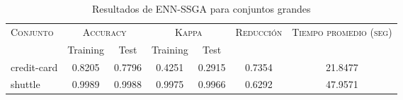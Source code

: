 \begin{table}[]
\centering
\begin{tabular}{l c c c c c c}
\hline
\multirow{2}{*}{\textsc{Conjunto}}
	& \multicolumn{2}{c}{\textsc{Accuracy}}
	& \multicolumn{2}{c}{\textsc{Kappa}}
	& \textsc{Reducción}
	& \textsc{Tiempo promedio (seg)} \\
	& Training & Test
	& Training & Test \\ 
\hline
\hline

credit-card & 0.8205 & 0.7796 & 0.4251 & 0.2915 & 0.7354 & 21.8477 \\
shuttle & 0.9989 & 0.9988 & 0.9975 & 0.9966 & 0.6292 & 47.9571 \\

\hline
\end{tabular}
\caption{Resultados de ENN-SSGA para conjuntos grandes }
\label{res-grande-enn-ssga}
\end{table}

